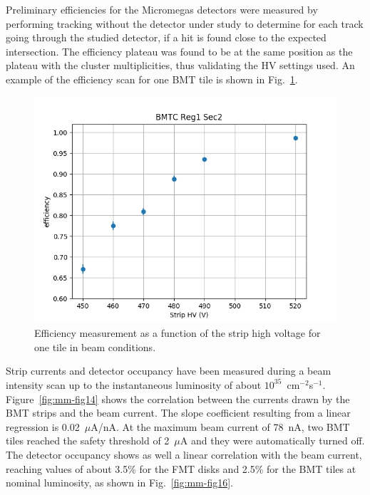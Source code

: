 Preliminary efficiencies for the Micromegas detectors were measured by performing tracking without the detector under study
to determine for each track going through the studied detector, if a hit is found close to the expected intersection. The
efficiency plateau was found to be at the same position as the plateau with the cluster multiplicities, thus validating the HV
settings used. An example of the efficiency scan for one BMT tile is shown in Fig.~\ref{fig:mm-eff_scan}.

\begin{figure}[htb]
 \includegraphics[width=1.0\columnwidth,keepaspectratio]{images/hvscan_BMTC_R1_S2.png}
 \caption{Efficiency measurement as a function of the strip high voltage for one tile in beam conditions.}
 \label{fig:mm-eff_scan}
\end{figure}

Strip currents and detector occupancy have been measured during a beam intensity scan up to the instantaneous luminosity of
about $10^{35}$~cm$^{-2}$s$^{-1}$. Figure~\ref{fig:mm-fig14} shows the correlation between the currents drawn by the BMT
strips and the beam current. The slope coefficient resulting from a linear regression is 0.02~$\mu$A/nA. At the maximum
beam current of 78~nA, two BMT tiles reached the safety threshold of 2~$\mu$A and they were automatically turned off. The
detector occupancy shows as well a linear correlation with the beam current, reaching values of about 3.5\% for the FMT disks
and 2.5\% for the BMT tiles at nominal luminosity, as shown in Fig.~\ref{fig:mm-fig16}.

